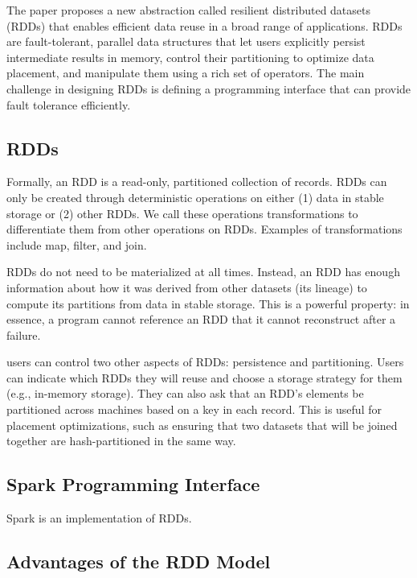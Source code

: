 
The paper proposes a new abstraction called resilient
distributed datasets (RDDs) that enables efficient
data reuse in a broad range of applications. RDDs are
fault-tolerant, parallel data structures that let users explicitly
persist intermediate results in memory, control
their partitioning to optimize data placement, and manipulate
them using a rich set of operators.
The main challenge in designing RDDs is defining a
programming interface that can provide fault tolerance
efficiently.

\subsection{RDDs}

Formally, an RDD is a read-only, partitioned collection
of records. RDDs can only be created through deterministic
operations on either (1) data in stable storage or (2)
other RDDs. We call these operations transformations to
differentiate them from other operations on RDDs. Examples
of transformations include map, filter, and join.

RDDs do not need to be materialized at all times. Instead,
an RDD has enough information about how it was
derived from other datasets (its lineage) to compute its
partitions from data in stable storage. This is a powerful
property: in essence, a program cannot reference an
RDD that it cannot reconstruct after a failure.

users can control two other aspects of RDDs:
persistence and partitioning. Users can indicate which
RDDs they will reuse and choose a storage strategy for
them (e.g., in-memory storage). They can also ask that
an RDD’s elements be partitioned across machines based
on a key in each record. This is useful for placement optimizations,
such as ensuring that two datasets that will
be joined together are hash-partitioned in the same way.

\subsection{Spark Programming Interface}

Spark is an implementation of RDDs.

\subsection{Advantages of the RDD Model}

